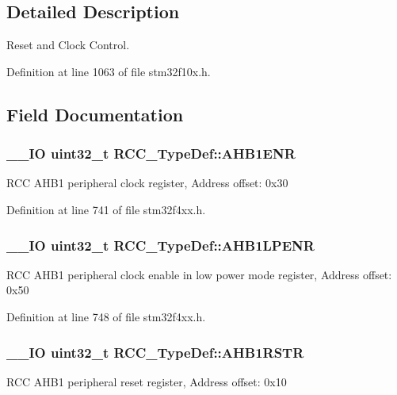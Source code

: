 \subsection{Detailed Description}
Reset and Clock Control. 

Definition at line 1063 of file stm32f10x.\-h.



\subsection{Field Documentation}
\hypertarget{struct_r_c_c___type_def_af58a7ad868f07f8759eac3e31b6fa79e}{
\subsubsection[{A\-H\-B1\-E\-N\-R}]{\setlength{\rightskip}{0pt plus 5cm}\-\_\-\-\_\-\-I\-O {\bf uint32\-\_\-t} R\-C\-C\-\_\-\-Type\-Def\-::\-A\-H\-B1\-E\-N\-R}}\label{struct_r_c_c___type_def_af58a7ad868f07f8759eac3e31b6fa79e}
R\-C\-C A\-H\-B1 peripheral clock register, Address offset\-: 0x30 

Definition at line 741 of file stm32f4xx.\-h.

\hypertarget{struct_r_c_c___type_def_a89d6c21f02196b7f59bcc30c1061dd87}{
\subsubsection[{A\-H\-B1\-L\-P\-E\-N\-R}]{\setlength{\rightskip}{0pt plus 5cm}\-\_\-\-\_\-\-I\-O {\bf uint32\-\_\-t} R\-C\-C\-\_\-\-Type\-Def\-::\-A\-H\-B1\-L\-P\-E\-N\-R}}\label{struct_r_c_c___type_def_a89d6c21f02196b7f59bcc30c1061dd87}
R\-C\-C A\-H\-B1 peripheral clock enable in low power mode register, Address offset\-: 0x50 

Definition at line 748 of file stm32f4xx.\-h.

\hypertarget{struct_r_c_c___type_def_ad6abf71a348744aa3f2b7e8b214c1ca4}{
\subsubsection[{A\-H\-B1\-R\-S\-T\-R}]{\setlength{\rightskip}{0pt plus 5cm}\-\_\-\-\_\-\-I\-O {\bf uint32\-\_\-t} R\-C\-C\-\_\-\-Type\-Def\-::\-A\-H\-B1\-R\-S\-T\-R}}\label{struct_r_c_c___type_def_ad6abf71a348744aa3f2b7e8b214c1ca4}
R\-C\-C A\-H\-B1 peripheral reset register, Address offset\-: 0x10 

